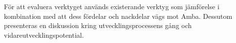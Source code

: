 För att evaluera verktyget används existerande verktyg som jämförelse i
kombination med att dess fördelar och nackdelar vägs mot Amba. Dessutom
presenteras en diskussion kring utvecklingsprocessens gång och
vidareutvecklingspotential.

